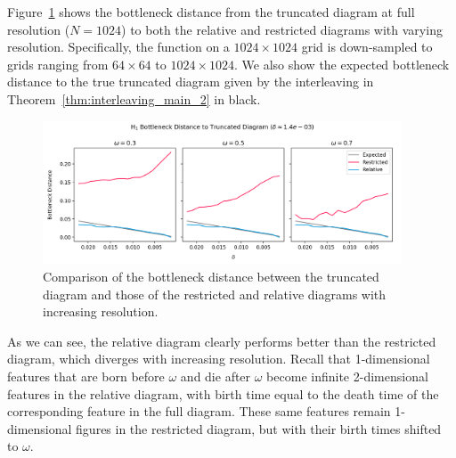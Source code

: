 Figure~\ref{fig:bottleneck} shows the bottleneck distance from the truncated diagram at full resolution ($N = 1024$) to both the relative and restricted diagrams with varying resolution.
Specifically, the function on a $1024\times 1024$ grid is down-sampled to grids ranging from $64\times 64$ to $1024\times 1024$.
We also show the expected bottleneck distance to the true truncated diagram given by the interleaving in Theorem~\ref{thm:interleaving_main_2} in black.

\begin{figure}[htbp]
  \centering
  \includegraphics[width=0.95\textwidth]{scripts/figures/matching2/bottleneck_delta.png}
  \caption{Comparison of the bottleneck distance between the truncated diagram and those of the restricted and relative diagrams with increasing resolution.}\label{fig:bottleneck}
\end{figure}

As we can see, the relative diagram clearly performs better than the restricted diagram, which diverges with increasing resolution.
Recall that 1-dimensional features that are born before $\omega$ and die after $\omega$ become infinite 2-dimensional features in the relative diagram, with birth time equal to the death time of the corresponding feature in the full diagram.
These same features remain 1-dimensional figures in the restricted diagram, but with their birth times shifted to $\omega$.

